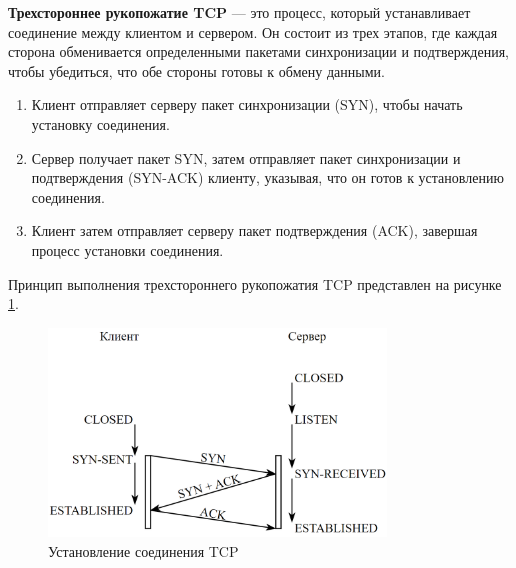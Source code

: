 \documentclass{bmstu}
\begin{document}



\textbf{Трехстороннее рукопожатие TCP} --- это процесс, который устанавливает соединение между клиентом и сервером. Он состоит из трех этапов, где каждая сторона обменивается определенными пакетами синхронизации и подтверждения, чтобы убедиться, что обе стороны готовы к обмену данными.

\begin{enumerate}
    \item Клиент отправляет серверу пакет синхронизации (SYN), чтобы начать установку соединения.
    \item Сервер получает пакет SYN, затем отправляет пакет синхронизации и подтверждения (SYN-ACK) клиенту, указывая, что он готов к установлению соединения.
    \item Клиент затем отправляет серверу пакет подтверждения (ACK), завершая процесс установки соединения.
\end{enumerate}

Принцип выполнения трехстороннего рукопожатия TCP представлен на рисунке \ref{img:tcp_receipt}.

\begin{figure}[hbtp]
 \centering
 \includegraphics[width=0.8\textwidth]{inc/img/3way.png}
 \caption{Установление соединения TCP}
 \label{img:tcp_receipt}
\end{figure}
\end{document}
